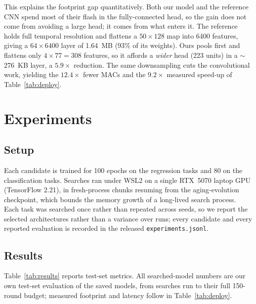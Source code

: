 \documentclass[journal]{IEEEtran}
\begin{document}
This explains the footprint gap quantitatively. Both our model and the reference
CNN spend most of their flash in the fully-connected head, so the gain does not
come from avoiding a large head; it comes from what enters it. The reference
holds full temporal resolution and flattens a $50\times128$ map into 6400
features, giving a $64\times6400$ layer of 1.64~MB (93\% of its weights).
Ours pools first and flattens only $4\times77 = 308$ features, so it affords a
\emph{wider} head (223 units) in a $\sim$276~KB layer, a $5.9\times$ reduction.
The same downsampling cuts the convolutional work, yielding the $12.4\times$
fewer MACs and the $9.2\times$ measured speed-up of Table~\ref{tab:deploy}.

\section{Experiments}
\subsection{Setup}
Each candidate is trained for 100 epochs on the regression tasks and 80 on the
classification tasks. Searches ran under WSL2 on a single RTX~5070 laptop GPU
(TensorFlow 2.21), in fresh-process chunks resuming from the aging-evolution
checkpoint, which bounds the memory growth of a long-lived search process. Each
task was searched once rather than repeated across seeds, so we report the
selected architectures rather than a variance over runs; every candidate and
every reported evaluation is recorded in the released
\texttt{experiments.jsonl}.

\subsection{Results}
Table~\ref{tab:results} reports test-set metrics. All searched-model numbers
are our own test-set evaluation of the saved models, from searches run to their
full 150-round budget; measured footprint and latency follow in
Table~\ref{tab:deploy}.
\end{document}
